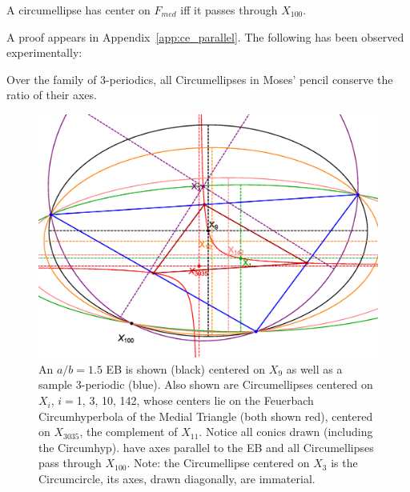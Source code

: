 \begin{proposition}
\label{th:9}
A circumellipse has  center on $F_{med}$ iff it passes through $X_{100}$.
\end{proposition}

A proof appears in Appendix~\ref{app:ce_parallel}. The following has been observed experimentally:

\begin{conjecture}
Over the family of 3-periodics, all Circumellipses in Moses' pencil conserve the ratio of their axes.
\label{conj:moses}
\end{conjecture}

\begin{figure}
    \centering
    \includegraphics[width=\textwidth]{pics_eps_new/0050_ce_x100.eps}
    \caption{An $a/b=1.5$ EB is shown (black) centered on $X_9$ as well as a sample 3-periodic (blue). Also shown are Circumellipses centered on $X_i$, $i=$1, 3, 10, 142, whose centers lie on the Feuerbach Circumhyperbola of the Medial Triangle (both shown red), centered on $X_{3035}$, the complement of $X_{11}$. Notice all conics drawn (including the Circumhyp). have axes parallel to the EB and all Circumellipses pass through $X_{100}$. Note: the Circumellipse centered on $X_3$ is the Circumcircle, its axes, drawn diagonally, are immaterial.}
    \label{fig:circum_parallel}
\end{figure}